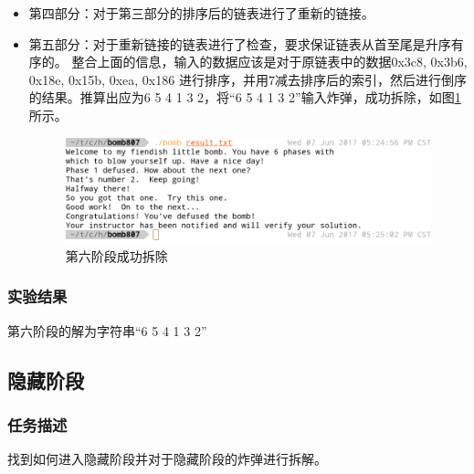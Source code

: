 \begin{itemize}
\begin{itemize}
		\end{itemize}
	\item 第四部分：对于第三部分的排序后的链表进行了重新的链接。
	\item 第五部分：对于重新链接的链表进行了检查，要求保证链表从首至尾是升序有序的。
		整合上面的信息，输入的数据应该是对于原链表中的数据0x3c8, 0x3b6, 0x18e, 0x15b, 0xea, 0x186 进行排序，并用7减去排序后的索引，然后进行倒序的结果。推算出应为6 5 4 1 3 2，将``6 5 4 1 3 2''输入炸弹，成功拆除，如图\ref{fig:fig13}所示。
		\begin{figure}[H]
			\centering
			\includegraphics[width=0.95\linewidth]{resources/fig13.png}
			\caption{第六阶段成功拆除}
			\label{fig:fig13}
		\end{figure}
\end{itemize}

\subsubsection{实验结果}
第六阶段的解为字符串``6 5 4 1 3 2''

\subsection{隐藏阶段}
\subsubsection{任务描述}
找到如何进入隐藏阶段并对于隐藏阶段的炸弹进行拆解。

